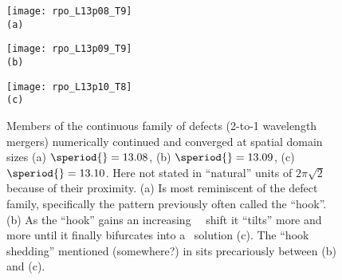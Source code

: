 \begin{description}

\begin{figure}[t]
\begin{minipage}[height=.30\textheight]{.30\textwidth}
\centering
\texttt{[image: rpo\_L13p08\_T9]}
\\ \small{\texttt{(a)}}
\end{minipage}
\begin{minipage}[height=.30\textheight]{.30\textwidth}
\centering
\texttt{[image: rpo\_L13p09\_T9]}
\\ \small{\texttt{(b)}}
\end{minipage}
\begin{minipage}[height=.30\textheight]{.30\textwidth}
\centering \small{
\texttt{[image: rpo\_L13p10\_T8]}
\\ \texttt{(c)}}
\end{minipage}
\caption{\label{f:MNGhookshedding}
Members of the continuous family of defects (2-to-1 wavelength mergers)
numerically continued and converged at spatial domain sizes
(a) $\speriod{}=13.08$, (b) $\speriod{}=13.09$, (c) $\speriod{}=13.10$.
Here not stated in ``natural'' units of $2\pi \sqrt{2}$ because of their
proximity.
(a)
Is most reminiscent of the defect family,
specifically the pattern previously often called the ``hook''.
(b)
As the ``hook'' gains an increasing \reqv\ \spt\ shift it ``tilts'' more and
more until it finally bifurcates into
a \reqv\ solution (c).
The ``hook shedding'' mentioned (somewhere?) in sits precariously between (b) and (c).
}
\end{figure}


\end{description}
